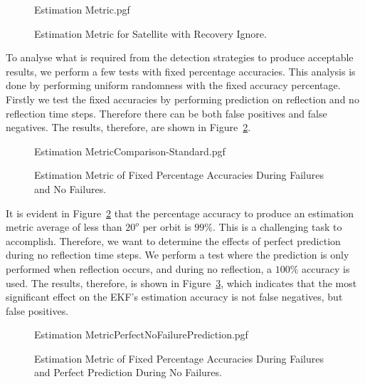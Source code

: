 \documentclass[letterpaper, 10 pt, conference]{ieeeconf}  %
\begin{document}
\begin{figure}[!htb]
	\begin{center}
		{Estimation Metric.pgf}
	\end{center}
	\caption[Estimation Metric for Satellite with Recovery Ignore]{Estimation Metric for Satellite with Recovery Ignore.}
	\label{fig:Estimation Accuracy EKF-ignore}
\end{figure}

To analyse what is required from the detection strategies to produce acceptable results, we perform a few tests with fixed percentage accuracies. This analysis is done by performing uniform randomness with the fixed accuracy percentage. Firstly we test the fixed accuracies by performing prediction on reflection and no reflection time steps. Therefore there can be both false positives and false negatives. The results, therefore, are shown in Figure~\ref{fig:Estimation Accuracy EKF-ignore Comparison}.

\begin{figure}[!htb]
	\begin{center}
		{Estimation MetricComparison-Standard.pgf}
	\end{center}
	\caption[Estimation Metric of Fixed Percentage Accuracies During Failures and No Failures]{Estimation Metric of Fixed Percentage Accuracies During Failures and No Failures.}
	\label{fig:Estimation Accuracy EKF-ignore Comparison}
\end{figure}

It is evident in Figure~\ref{fig:Estimation Accuracy EKF-ignore Comparison} that the percentage accuracy to produce an estimation metric average of less than $20^o$ per orbit is $99\%$. This is a challenging task to accomplish. Therefore, we want to determine the effects of perfect prediction during no reflection time steps. We perform a test where the prediction is only performed when reflection occurs, and during no reflection, a $100\%$ accuracy is used. The results, therefore, is shown in Figure~\ref{fig:Estimation Accuracy EKF-ignore Comparison PerfectNoFailure}, which indicates that the most significant effect on the EKF's estimation accuracy is not false negatives, but false positives.

\begin{figure}[!htb]
	\begin{center}
		{Estimation MetricPerfectNoFailurePrediction.pgf}
	\end{center}
	\caption[Estimation Metric of Fixed Percentage Accuracies During Failures and Perfect Prediction During No Failures]{Estimation Metric of Fixed Percentage Accuracies During Failures and Perfect Prediction During No Failures.}
	\label{fig:Estimation Accuracy EKF-ignore Comparison PerfectNoFailure}
\end{figure}
\end{document}
